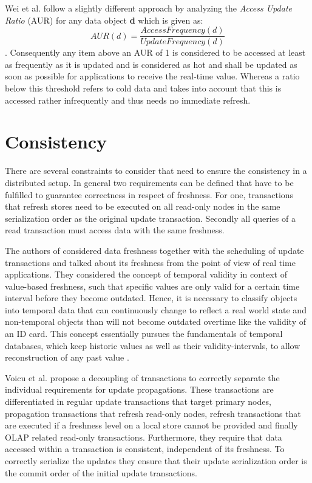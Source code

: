 Wei et al. \cite{wei:2004} follow a slightly different approach by analyzing the \emph{Access Update Ratio} (AUR) for any data object \textbf{d} which is given as: 
\begin{equation}
AUR(d) = \frac{AccessFrequency(d)}{UpdateFrequency(d)}
\end{equation}. 
Consequently any item above an AUR of 1 is considered to be accessed at least as frequently as it is updated
and is considered as hot and shall be updated as soon as possible for applications to receive the real-time value. 
Whereas a ratio below this threshold refers to cold data and takes into account that this is accessed rather infrequently and thus needs no immediate refresh. 







\section{Consistency}
There are several constraints to consider that need to ensure the consistency in a distributed setup. In general two requirements can be defined that have to be fulfilled to
guarantee correctness in respect of freshness. For one, transactions that refresh stores need to be executed on all read-only nodes in the same serialization order as the 
original update transaction. Secondly all queries of a read transaction must access data with the same freshness.


The authors of \cite{xiang:2008}\cite{wei:2004} considered data freshness together with the scheduling of update transactions and talked about its freshness from the 
point of view of real time applications. They considered the concept of temporal validity in context of value-based freshness,
such that specific values are only valid for a certain time interval before they become outdated. Hence, it is necessary to classify objects into
temporal data that can continuously change to reflect a real world state and non-temporal objects than will not become outdated overtime like the validity of an ID card.
This concept essentially pursues the fundamentals of temporal databases, which keep historic values as well as their validity-intervals, to allow reconstruction of any 
past value \cite{etzion:1998}. 

Voicu et al. \cite{voicu:2010} propose a decoupling of transactions to correctly separate the individual requirements for update propagations.
These transactions are differentiated in regular update transactions that target primary nodes, propagation transactions that refresh read-only nodes, 
refresh transactions that are executed if a freshness level on a local store cannot be provided and finally OLAP related read-only transactions.
Furthermore, they require that data accessed within a transaction is consistent, independent of its freshness. To correctly serialize the updates
they ensure that their update serialization order is the commit order of the initial update transactions.

